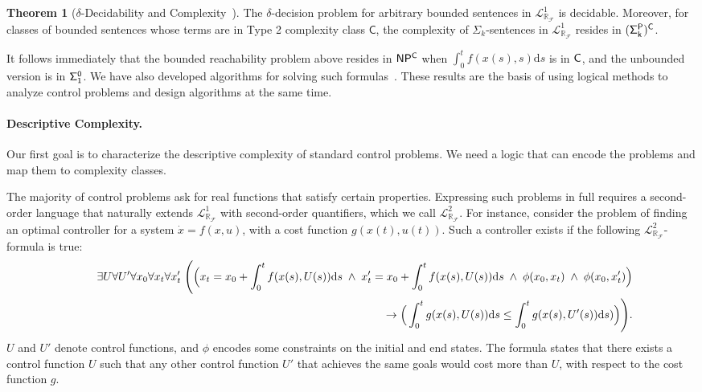 \documentclass[10pt]{article}
\newcommand{\lrf}{\mathcal{L}_{\mathbb{R}_{\mathcal{F}}}}
\theoremstyle{definition}
\newtheorem{theorem}{Theorem}
\begin{document}
\begin{theorem}[$\delta$-Decidability and Complexity~\cite{DBLP:conf/lics/GaoAC12}] The $\delta$-decision problem for arbitrary bounded sentences in $\lrf^1$ is decidable. Moreover, for classes of bounded sentences whose terms are in Type 2 complexity class $\mathsf{C}$, the complexity of $\Sigma_k$-sentences in $\lrf^1$ resides in ${\sf (\Sigma^P_k)^C}$. 
\end{theorem}
It follows immediately that the bounded reachability problem above resides in ${\sf NP^C}$ when $\int_{0}^t f(x(s),s)\mathrm{d}s$ is in ${\sf C}$, and the unbounded version is in ${\sf \Sigma^0_1}$. We have also developed algorithms for solving such formulas~\cite{DBLP:conf/fmcad/GaoKC13}. These results are the basis of using logical methods to analyze control problems and design algorithms at the same time. 

\paragraph{Descriptive Complexity.}
Our first goal is to characterize the descriptive complexity of standard control problems. We need a logic that can encode the problems and map them to complexity classes. 

The majority of control problems ask for real functions that satisfy certain properties. Expressing such problems in full requires a second-order language that naturally extends $\lrf^1$ with second-order quantifiers, which we call $\lrf^2$. For instance, consider the problem of finding an optimal controller for a system $\dot x = f({x}, u)$, with a cost function $g(x(t),u(t))$. Such a controller exists if the following $\lrf^2$-formula is true:
\begin{eqnarray*}
& &\exists U \forall U' \forall {x_0}\forall {x_t} \forall {x_t'} \;\Bigg( \Big({x_t} = {x_0} + \int_{0}^t f({x}(s),U(s))\mathrm{d}s \;\wedge\;  x_t' = x_0 + \int_{0}^t f(x(s),U(s))\mathrm{d}s
\;\wedge\; \phi(x_0, x_t) \;\wedge\; \phi(x_0, x_t')\Big)\\
& &\hspace{9.5cm} \rightarrow \Big(\int_0^t g(x(s),U(s))\mathrm{d}s \leq  \int_0^t g(x(s),U'(s))\mathrm{d}s)\Big) \Bigg).
\end{eqnarray*}
$U$ and $U'$ denote control functions, and $\phi$ encodes some constraints on the initial and end states. The formula states that there exists a control function $U$ such that any other control function $U'$ that achieves the same goals would cost more than $U$, with respect to the cost function $g$. 
\end{document}
